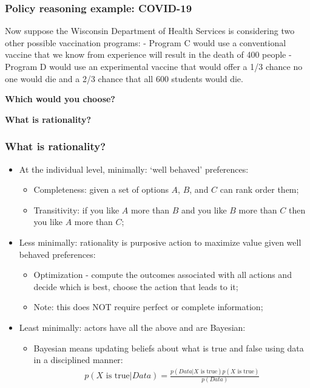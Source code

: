 \documentclass[aspectratio=169]{beamer}
\theoremstyle{principle}
\begin{document}
\begin{frame}
\frametitle{Policy reasoning example: COVID-19}

Now suppose the Wisconsin Department of Health Services is considering two other possible vaccination programs: - Program C would use a conventional vaccine that we know from experience will result in the death of 400 people - Program D would use an experimental vaccine that would offer a 1/3 chance no one would die and a 2/3 chance that all 600 students would die.
\bigskip
\bigskip
\begin{center}
\textbf{Which would you choose?}
\end{center}
\end{frame}

\begin{frame}
\begin{center}
\Huge \textbf{What is rationality?}
\end{center}
\end{frame}

\begin{frame}
\frametitle{What is rationality?}

\begin{itemize}
\item At the individual level, minimally: `well behaved' preferences:\color{white}
\begin{itemize}
\item Completeness: given a set of options $A$, $B$, and $C$ can rank order them;
\item Transitivity: if you like $A$ more than $B$ and you like $B$ more than $C$ then you like $A$ more than $C$;
\end{itemize}
\bigskip
\item[] Less minimally: rationality is purposive action to maximize value given well behaved preferences:
\begin{itemize}
\item[] \color{white}Optimization - compute the outcomes associated with all actions and decide which is best, choose the action that leads to it;
\item[] \color{white}Note: this does NOT require perfect or complete information;
\end{itemize}
\bigskip
\item[] Least minimally: actors have all the above and are Bayesian:
\begin{itemize}
\item[] \color{white}Bayesian means updating beliefs about what is true and false using data in a disciplined manner:
\begin{align*}
p(X\mbox{ is true}|Data) = \frac{p(Data|X\mbox{ is true})p(X\mbox{ is true})}{p(Data)}
\end{align*}
\end{itemize}
\end{itemize} 

\end{frame}
\end{document}
